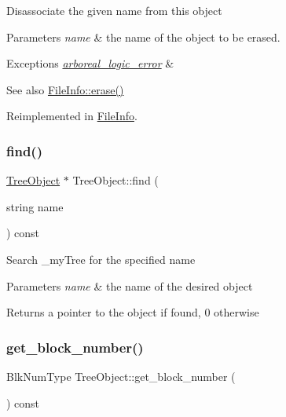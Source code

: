 Disassociate the given name from this object 
\begin{DoxyParams}{Parameters}
{\em name} & the name of the object to be erased. \\
\hline
\end{DoxyParams}

\begin{DoxyExceptions}{Exceptions}
{\em \mbox{\hyperlink{classarboreal__logic__error}{arboreal\+\_\+logic\+\_\+error}}} & \\
\hline
\end{DoxyExceptions}
\begin{DoxySeeAlso}{See also}
\mbox{\hyperlink{classFileInfo_ae058242283d3317eaf2b79428e6137f6}{File\+Info\+::erase()}} 
\end{DoxySeeAlso}


Reimplemented in \mbox{\hyperlink{classFileInfo_ae058242283d3317eaf2b79428e6137f6}{File\+Info}}.

\mbox{\label{classTreeObject_a6a7477c29a06a9896df549f83611252f}} 
\subsubsection{\texorpdfstring{find()}{find()}}
{\footnotesize\ttfamily \mbox{\hyperlink{classTreeObject}{Tree\+Object}} $\ast$ Tree\+Object\+::find (\begin{DoxyParamCaption}\item[{string}]{name }\end{DoxyParamCaption}) const}

Search \+\_\+my\+Tree for the specified name 
\begin{DoxyParams}{Parameters}
{\em name} & the name of the desired object \\
\hline
\end{DoxyParams}
\begin{DoxyReturn}{Returns}
a pointer to the object if found, 0 otherwise 
\end{DoxyReturn}
\mbox{\label{classTreeObject_af7841065fe85d0884341d72669185169}} 
\subsubsection{\texorpdfstring{get\+\_\+block\+\_\+number()}{get\_block\_number()}}
{\footnotesize\ttfamily Blk\+Num\+Type Tree\+Object\+::get\+\_\+block\+\_\+number (\begin{DoxyParamCaption}{ }\end{DoxyParamCaption}) const}

